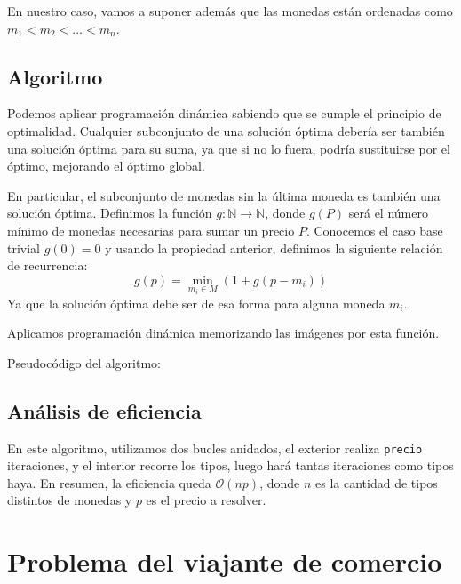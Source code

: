 \documentclass[a4paper, 11pt]{article} %
\begin{document}
    En nuestro caso, vamos a suponer además que las monedas están ordenadas como
    $m_1 < m_2 < \dots < m_n$. 
    
  \subsection{Algoritmo}
    Podemos aplicar programación dinámica sabiendo que se cumple el principio de optimalidad.
    Cualquier subconjunto de una solución óptima debería ser también una solución óptima para
    su suma, ya que si no lo fuera, podría sustituirse por el óptimo, mejorando el óptimo global.
    
    En particular, el subconjunto de monedas sin la última moneda es también una solución óptima.
    Definimos la función $g: \mathbb{N} \to \mathbb{N}$, donde $g(P)$ será el número
    mínimo de monedas necesarias para sumar un precio $P$. Conocemos el caso base trivial $g(0) = 0$ y
    usando la propiedad anterior, definimos la siguiente relación de recurrencia:
    \begin{equation}
      g(p) = \min_{m_i \in M} (1 + g(p - m_i))
    \end{equation}
    Ya que la solución óptima debe ser de esa forma para alguna moneda $m_i$.
  
    Aplicamos programación dinámica memorizando las imágenes por esta función.
    
    Pseudocódigo del algoritmo:
    
 		\small
 		\texttt{}
 		\normalsize
 	
 	\subsection{Análisis de eficiencia}
 	En este algoritmo, utilizamos dos bucles anidados,
 	el exterior realiza \texttt{precio} iteraciones, y el interior recorre los tipos, luego hará tantas iteraciones como tipos haya. En resumen, la eficiencia queda $\mathcal{O}(np)$, donde $n$ es la cantidad de tipos distintos de monedas y $p$ es el precio a resolver.
  
\section{Problema del viajante de comercio}
\end{document}
